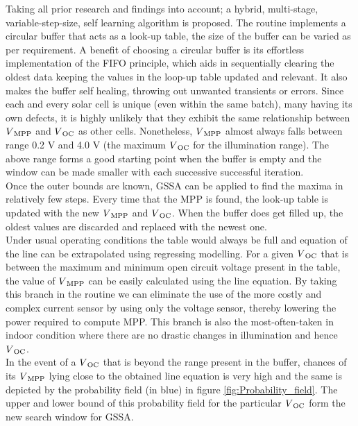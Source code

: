 Taking all prior research and findings into account; a hybrid, multi-stage, variable-step-size, self learning algorithm is proposed. The routine implements a circular buffer that acts as a look-up table, the size of the buffer can be varied as per requirement. A benefit of choosing a circular buffer is its effortless implementation of the \ac{FIFO} principle, which aids in sequentially clearing the oldest data keeping the values in the loop-up table updated and relevant. It also makes the buffer self healing, throwing out unwanted transients or errors. Since each and every solar cell is unique (even within the same batch), many having its own defects, it is highly unlikely that they exhibit the same relationship between $V\textsubscript{MPP}$ and $V\textsubscript{OC}$ as other cells. Nonetheless, $V\textsubscript{MPP}$ almost always falls between range 0.2 V and 4.0 V (the maximum $V\textsubscript{OC}$ for the illumination range). The above range forms a good starting point when the buffer is empty and the window can be made smaller with each successive successful iteration.\\

Once the outer bounds are known, \ac{GSSA} can be applied to find the maxima in relatively few steps. Every time that the \ac{MPP} is found, the look-up table is updated with the new $V\textsubscript{MPP}$ and $V\textsubscript{OC}$. When the buffer does get filled up, the oldest values are discarded and replaced with the newest one.\\

Under usual operating conditions the table would always be full and equation of the line can be extrapolated using regressing modelling. For a given $V\textsubscript{OC}$ that is between the maximum and minimum open circuit voltage present in the table, the value of $V\textsubscript{MPP}$ can be easily calculated using the line equation. By taking this branch in the routine we can eliminate the use of the more costly and complex current sensor \cite{urayai2011single} by using only the voltage sensor, thereby lowering the power required to compute \ac{MPP}. This branch is also the most-often-taken in indoor condition where there are no drastic changes in illumination and hence $V\textsubscript{OC}$.\\  
         
In the event of a $V\textsubscript{OC}$ that is beyond the range present in the buffer, chances of its $V\textsubscript{MPP}$ lying close to the obtained line equation is very high and the same is depicted by the probability field (in blue) in figure \ref{fig:Probability_field}. The upper and lower bound of this probability field for the particular $V\textsubscript{OC}$ form the new search window for \ac{GSSA}.\\
 
